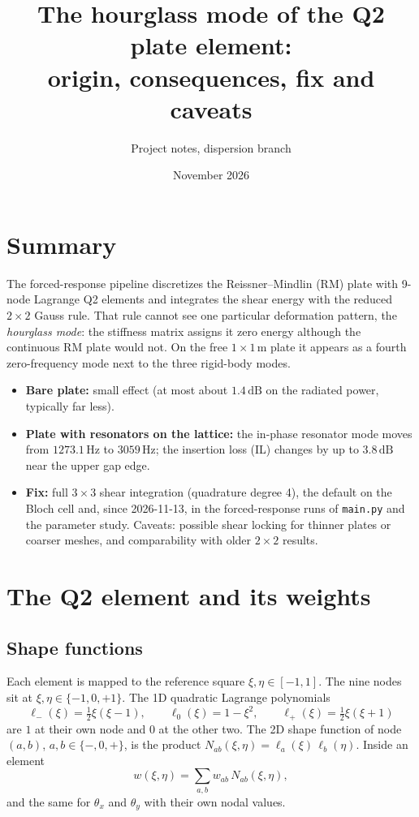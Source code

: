 \documentclass[11pt]{article}
\title{The hourglass mode of the Q2 plate element:\\ origin, consequences, fix and caveats}
\author{Project notes, dispersion branch}
\date{November 2026}
\begin{document}
\maketitle

\section{Summary}

The forced-response pipeline discretizes the Reissner--Mindlin (RM) plate with
9-node Lagrange Q2 elements and integrates the shear energy with the reduced
$2\times 2$ Gauss rule. That rule cannot see one particular deformation pattern,
the \emph{hourglass mode}: the stiffness matrix assigns it zero energy although the
continuous RM plate would not. On the free $1 \times 1\,\mathrm{m}$ plate it appears
as a fourth zero-frequency mode next to the three rigid-body modes.
\begin{itemize}
  \item \textbf{Bare plate:} small effect (at most about $1.4\,\mathrm{dB}$ on the
        radiated power, typically far less).
  \item \textbf{Plate with resonators on the lattice:} the in-phase resonator mode
        moves from $1273.1\,\mathrm{Hz}$ to $3059\,\mathrm{Hz}$; the insertion loss
        (IL) changes by up to $3.8\,\mathrm{dB}$ near the upper gap edge.
  \item \textbf{Fix:} full $3\times 3$ shear integration (quadrature degree 4),
        the default on the Bloch cell and, since 2026-11-13, in the forced-response
        runs of \texttt{main.py} and the parameter study. Caveats: possible shear
        locking for thinner plates or coarser meshes, and comparability with older
        $2\times 2$ results.
\end{itemize}

\section{The Q2 element and its weights}

\subsection{Shape functions}
Each element is mapped to the reference square $\xi, \eta \in [-1, 1]$. The nine
nodes sit at $\xi, \eta \in \{-1, 0, +1\}$. The 1D quadratic Lagrange polynomials
\begin{equation}
  \ell_-(\xi) = \tfrac12 \xi(\xi - 1), \qquad
  \ell_0(\xi) = 1 - \xi^2, \qquad
  \ell_+(\xi) = \tfrac12 \xi(\xi + 1)
\end{equation}
are $1$ at their own node and $0$ at the other two. The 2D shape function of node
$(a, b)$, $a, b \in \{-, 0, +\}$, is the product $N_{ab}(\xi, \eta) =
\ell_a(\xi)\,\ell_b(\eta)$. Inside an element
\begin{equation}
  w(\xi, \eta) = \sum_{a,b} w_{ab}\, N_{ab}(\xi, \eta),
\end{equation}
and the same for $\theta_x$ and $\theta_y$ with their own nodal values.
\end{document}
